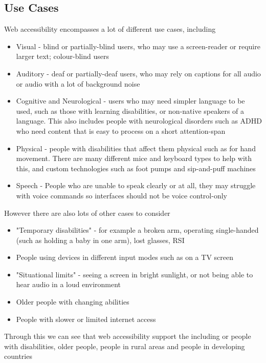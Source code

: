 \documentclass[ %
                    author={Aleena Baig},
                supervisor={Dr Simon Lock},
                    degree={BSc},
                     title={On Making Web Accessible Graphs},
                  subtitle={},
                      year={2019} ]{dissertation}
\begin{document}
\subsection{Use Cases}
%
Web accessibility encompasses a lot of different use cases, including
%
\begin{itemize}
    \item Visual - blind or partially-blind users, who may use a screen-reader or require larger text; colour-blind users
    \item Auditory - deaf or partially-deaf users, who may rely on captions for all audio or audio with a lot of background noise
    \item Cognitive and Neurological - users who may need simpler language to be used, such as those with learning disabilities, or non-native speakers of a language. This also includes people with neurological disorders such as ADHD who need content that is easy to process on a short attention-span
    \item Physical - people with disabilities that affect them physical such as for hand movement. There are many different mice and keyboard types to help with this, and custom technologies such as foot pumps and sip-and-puff machines
    \item Speech - People who are unable to speak clearly or at all, they may struggle with voice commands so interfaces should not be voice control-only
\end{itemize}
%
However there are also lots of other cases to consider \cite{WAIaccessibilityintro}
%
\begin{itemize}
    \item "Temporary disabilities" - for example a broken arm, operating single-handed (such as holding a baby in one arm), lost glasses, RSI
    \item People using devices in different input modes such as on a TV screen
    \item "Situational limits" - seeing a screen in bright sunlight, or not being able to hear audio in a loud environment
    \item Older people with changing abilities
    \item People with slower or limited internet access
\end{itemize}
%
Through this we can see that web accessibility support the including or people with disabilities, older people, people in rural areas and people in developing countries
%
\end{document}
